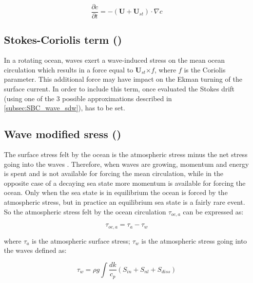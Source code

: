 \documentclass[../main/NEMO_manual]{subfiles}
\begin{document}
\[
  \frac{\partial{c}}{\partial{t}} =
  - (\mathbf{U} + \mathbf{U}_{st}) \cdot \nabla{c}
\]


\subsection{Stokes-Coriolis term (\protect{})}
\label{subsec:SBC_wave_stcor}

In a rotating ocean, waves exert a wave-induced stress on the mean ocean circulation which results 
in a force equal to $\mathbf{U}_{st}$×$f$, where $f$ is the Coriolis parameter. 
This additional force may have impact on the Ekman turning of the surface current. 
In order to include this term, once evaluated the Stokes drift (using one of the 3 possible 
approximations described in \autoref{subsec:SBC_wave_sdw}), 
 has to be set.


\subsection{Wave modified sress (\protect{})} 
\label{subsec:SBC_wave_tauw}

The surface stress felt by the ocean is the atmospheric stress minus the net stress going 
into the waves \citep{Janssen_al_TM13}. Therefore, when waves are growing, momentum and energy is spent and is not 
available for forcing the mean circulation, while in the opposite case of a decaying sea 
state more momentum is available for forcing the ocean. 
Only when the sea state is in equilibrium the ocean is forced by the atmospheric stress, 
but in practice an equilibrium sea state is a fairly rare event. 
So the atmospheric stress felt by the ocean circulation $\tau_{oc,a}$ can be expressed as: 

\[
  \tau_{oc,a} = \tau_a - \tau_w
\]

where $\tau_a$ is the atmospheric surface stress;
$\tau_w$ is the atmospheric stress going into the waves defined as:

\[
  \tau_w = \rho g \int {\frac{dk}{c_p} (S_{in}+S_{nl}+S_{diss})}
\]
\end{document}
